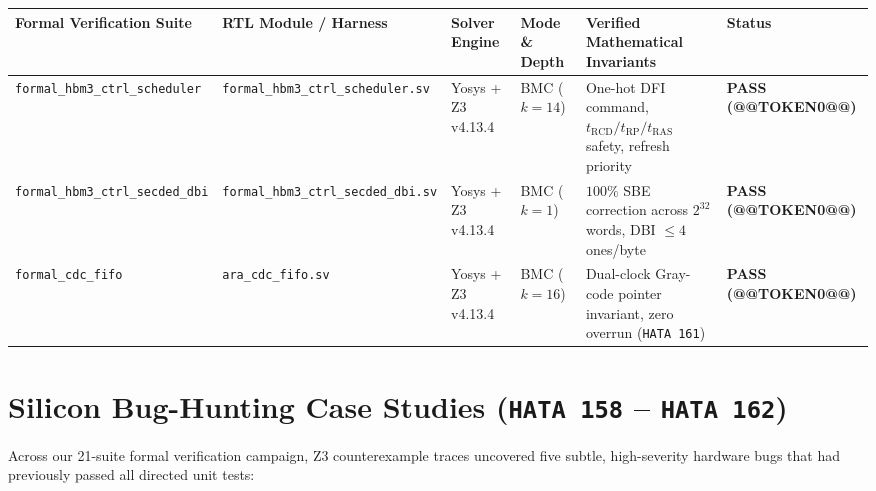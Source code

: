 \documentclass[journal,10pt,twocolumn]{IEEEtran}
\begin{document}
\begin{table}[htbp]
\centering\footnotesize
\begin{tabular}{p{} p{} p{} p{} p{} p{}}
\toprule
\textbf{Formal Verification Suite} & \textbf{RTL Module / Harness} & \textbf{Solver Engine} & \textbf{Mode \& Depth} & \textbf{Verified Mathematical Invariants} & \textbf{Status} \\
\midrule
\texttt{formal\_hbm3\_ctrl\_scheduler} & \texttt{formal\_hbm3\_ctrl\_scheduler.sv} & Yosys + Z3 v4.13.4 & BMC ($k=14$) & One-hot DFI command, $t_{\mathrm{RCD}}/t_{\mathrm{RP}}/t_{\mathrm{RAS}}$ safety, refresh priority & \textbf{PASS (@@TOKEN0@@)} \\
\texttt{formal\_hbm3\_ctrl\_secded\_dbi} & \texttt{formal\_hbm3\_ctrl\_secded\_dbi.sv} & Yosys + Z3 v4.13.4 & BMC ($k=1$) & $100\%$ SBE correction across $2^{32}$ words, DBI $\le 4$ ones/byte & \textbf{PASS (@@TOKEN0@@)} \\
\texttt{formal\_cdc\_fifo} & \texttt{ara\_cdc\_fifo.sv} & Yosys + Z3 v4.13.4 & BMC ($k=16$) & Dual-clock Gray-code pointer invariant, zero overrun (\texttt{HATA 161}) & \textbf{PASS (@@TOKEN0@@)} \\
\bottomrule
\end{tabular}
\vspace{4pt}
\end{table}


\section{Silicon Bug-Hunting Case Studies (\texttt{HATA 158} – \texttt{HATA 162})}

Across our 21-suite formal verification campaign, Z3 counterexample traces uncovered five subtle, high-severity hardware bugs that had previously passed all directed unit tests:
\end{document}

